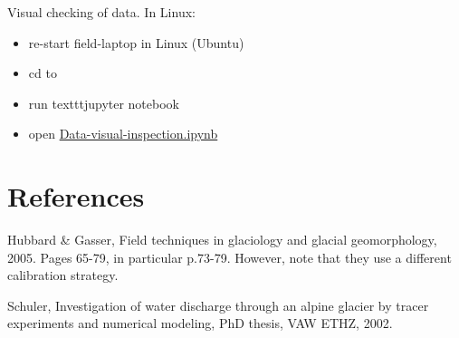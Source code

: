 \documentclass[DIV=15,halfparskip,11pt,headinclude]{scrartcl}
\begin{document}
Visual checking of data.  In Linux:
\begin{itemize}
\item re-start field-laptop in Linux (Ubuntu)
\item cd to
\item run texttt{jupyter notebook}
\item open \url{Data-visual-inspection.ipynb}
\end{itemize}



\section{References}

Hubbard \& Gasser, Field techniques in glaciology and glacial
geomorphology, 2005.  Pages 65-79, in particular p.73-79.  However,
note that they use a different calibration strategy.

Schuler, Investigation of water discharge through an alpine glacier by
tracer experiments and numerical modeling, PhD thesis, VAW ETHZ, 2002.
\end{document}
